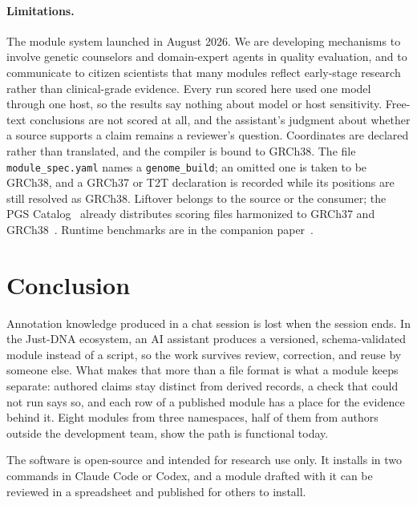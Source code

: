 \documentclass[11pt,a4paper]{article}
\begin{document}
\paragraph{Limitations.}
The module system launched in August 2026. We are developing mechanisms to involve genetic counselors and
domain-expert agents in quality evaluation, and to communicate to citizen
scientists that many modules reflect early-stage research rather than
clinical-grade evidence. Every run scored here used one model
through one host, so the results say nothing about model or host sensitivity.
Free-text conclusions are not scored at all, and the assistant's judgment about
whether a source supports a claim remains a reviewer's question. Coordinates
are declared rather than translated, and the compiler is bound to GRCh38.
The file \texttt{module\_spec.yaml} names a \texttt{genome\_build}; an omitted one is
taken to be GRCh38, and a GRCh37 or T2T declaration is recorded while its
positions are still resolved as GRCh38. Liftover belongs
to the source or the consumer; the PGS Catalog~\citep{lambert2021pgs} already
distributes scoring files harmonized to GRCh37 and GRCh38~\citep{pgscatalogdownloads}. Runtime benchmarks are in the companion
paper~\citep{companion2026justdnalite}.

\section{Conclusion}

Annotation knowledge produced in a chat session is lost when the session ends.
In the Just-DNA ecosystem, an AI assistant produces a versioned,
schema-validated module instead of a script, so the work survives review,
correction, and reuse by someone else. What makes that more than a file format
is what a module keeps separate: authored claims stay distinct from derived
records, a check that
could not run says so, and each row of a published module has a place for
the evidence behind it. Eight modules from three namespaces, half of them from authors
outside the development team, show the path is functional today.

The software is open-source and intended for research use only. It installs
in two commands in Claude Code or Codex, and a module drafted with it can be
reviewed in a spreadsheet and published for others to install.

\end{document}
